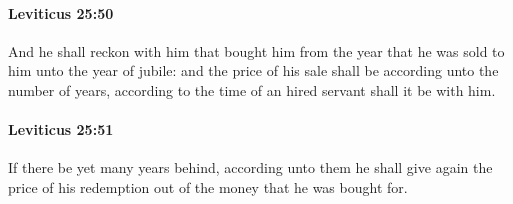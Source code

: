 		\paragraph{Leviticus 25:50} %
			\label{LEVITICUS-25-50}

			And he shall reckon with him that bought him from the year that he was sold to him unto the year of jubile: and the price of his sale shall be according unto the number of years, according to the time of an hired servant shall it be with him.


		\paragraph{Leviticus 25:51} %
			\label{LEVITICUS-25-51}

			If there be yet many years behind, according unto them he shall give again the price of his redemption out of the money that he was bought for.

